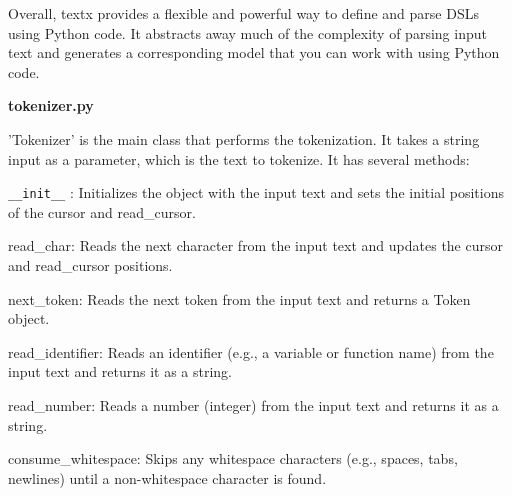 Overall, textx provides a flexible and powerful way to define and parse DSLs using Python code. It abstracts away much of the complexity of parsing input text and generates a corresponding model that you can work with using Python code.



\textbf{tokenizer.py}

'Tokenizer' is the main class that performs the tokenization. It takes a string input as a parameter, which is the text to tokenize. It has several methods:

\texttt{\_\_init\_\_}
: Initializes the object with the input text and sets the initial positions of the cursor and read\_cursor.

read\_char: Reads the next character from the input text and updates the cursor and read\_cursor positions.

next\_token: Reads the next token from the input text and returns a Token object.

read\_identifier: Reads an identifier (e.g., a variable or function name) from the input text and returns it as a string.

read\_number: Reads a number (integer) from the input text and returns it as a string.

consume\_whitespace: Skips any whitespace characters (e.g., spaces, tabs, newlines) until a non-whitespace character is found.

